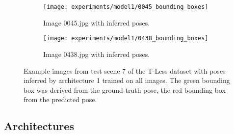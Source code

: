 \begin{figure}[!tbp]
	\begin{subfigure}[t]{0.47\textwidth}
		\centering
    	\texttt{[image: experiments/model1/0045\_bounding\_boxes]}
    	\caption{Image 0045.jpg with inferred poses.}
	\end{subfigure} 
	\hfill
	\begin{subfigure}[t]{0.47\textwidth}
		\centering
    	\texttt{[image: experiments/model1/0438\_bounding\_boxes]}
    	\caption{Image 0438.jpg with inferred poses.}
	\end{subfigure} 
	\caption{Example images from test scene 7 of the T-Less dataset with poses inferred by architecture 1 trained on all images. The green bounding box was derived from the ground-truth pose, the red bounding box from the predicted pose.}
	\label{fig:architecture_experiments_example_frames}
\end{figure} 

\subsection{Architectures} \label{subsection:architectures}


